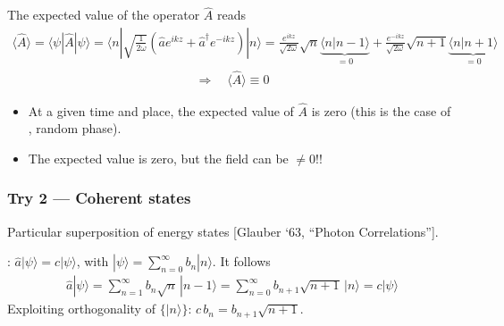 \documentclass[letterpaper,10pt,english]{jupyterBook}
\begin{document}
\sphinxAtStartPar
The expected value of the operator \(\hat A\) reads
\begin{equation*}
\begin{split}
\langle\hat A\rangle=\langle\psi|\hat A|\psi\rangle
=\langle n|\sqrt{\tfrac1{2\omega}}\left(\hat ae^{ikz}+\hat a^\dagger e^{-ikz}\right)|n\rangle
=\frac{e^{ikz}}{\sqrt{2\omega}}\sqrt n\underbrace{\langle n|n-1\rangle}_{=0}+\frac{e^{-ikz}}{\sqrt{2\omega}}\sqrt{n+1}\underbrace{\langle n|n+1\rangle}_{=0}
\end{split}
\end{equation*}\begin{equation*}
\begin{split}
\Rightarrow\quad\langle\hat A\rangle\equiv0
\end{split}
\end{equation*}\begin{itemize}
\item {} 
\sphinxAtStartPar
At a given time and place, the expected value of \(\hat A\) is zero (this is the case of , random phase).

\item {} 
\sphinxAtStartPar
The expected value is zero, but the field can be \(\neq0\)!!

\end{itemize}


\subsubsection{Try 2 — Coherent states}
\label{\detokenize{ch/quantum-mechanics/qft/photons:try-2-coherent-states}}\label{\detokenize{ch/quantum-mechanics/qft/photons:quantum-mechanics-qft-photons-em-field-quantization-classical-limit-coherent-states}}
\sphinxAtStartPar
Particular superposition of energy states {[}Glauber ‘63, “Photon Correlations”{]}.

\sphinxAtStartPar
{}: \(\hat a|\psi\rangle=c|\psi\rangle\), with \(|\psi\rangle=\sum_{n=0}^{\infty}b_n|n\rangle\). It follows
\begin{equation*}
\begin{split}
\hat a|\psi\rangle=\sum_{n=1}^{\infty}b_n\sqrt n\,|n-1\rangle=\sum_{n=0}^{\infty}b_{n+1}\sqrt{n+1}\,|n\rangle=c|\psi\rangle
\end{split}
\end{equation*}
\sphinxAtStartPar
Exploiting orthogonality of \(\{|n\rangle\}\): \(c\,b_n=b_{n+1}\sqrt{n+1}\).
\end{document}
